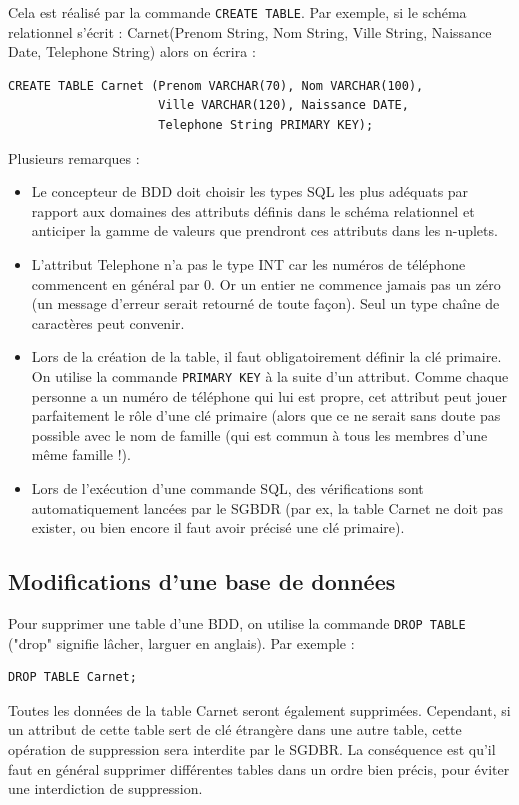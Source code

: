 \documentclass[11pt,a4paper,french,twoside]{PMCours}
\begin{document}
Cela est réalisé par la commande \verb'CREATE TABLE'. Par exemple, si le schéma relationnel s'écrit : 
Carnet(Prenom String, Nom String, Ville String, Naissance Date, Telephone String)
alors on écrira :
\begin{verbatim}
CREATE TABLE Carnet (Prenom VARCHAR(70), Nom VARCHAR(100), 
                     Ville VARCHAR(120), Naissance DATE,
                     Telephone String PRIMARY KEY);
\end{verbatim}
Plusieurs remarques : 
\begin{itemize}
 \item Le concepteur de BDD doit choisir les types SQL les plus adéquats par rapport aux domaines des attributs définis dans le schéma relationnel et anticiper la gamme de valeurs que prendront ces attributs dans les n-uplets.
 \item L'attribut Telephone n'a pas le type INT car les numéros de téléphone commencent en général par 0. Or un entier ne commence jamais pas un zéro (un message d'erreur serait retourné de toute façon). Seul un type chaîne de caractères peut convenir.
 \item Lors de la création de la table, il faut obligatoirement définir la clé primaire. On utilise la commande \verb'PRIMARY KEY' à la suite d'un attribut. Comme chaque personne a un numéro de téléphone qui lui est propre, cet attribut peut jouer parfaitement le rôle d'une clé primaire (alors que ce ne serait sans doute pas possible avec le nom de famille (qui est commun à tous les membres d'une même famille !). %
 \item Lors de l'exécution d'une commande SQL, des vérifications sont automatiquement lancées par le SGBDR (par ex, la table Carnet ne doit pas exister, ou bien encore il faut avoir précisé une clé primaire).
\end{itemize}


\subsection{Modifications d'une base de données}

Pour supprimer une table d'une BDD, on utilise la commande \verb'DROP TABLE' ("drop" signifie lâcher, larguer en anglais). Par exemple : 
\begin{verbatim}
DROP TABLE Carnet;
\end{verbatim}
Toutes les données de la table Carnet seront également supprimées. Cependant, si un attribut de cette table sert de clé étrangère dans une autre table, cette opération de suppression sera interdite par le SGDBR. La conséquence est qu'il faut en général supprimer différentes tables dans un ordre bien précis, pour éviter une interdiction de suppression.
\end{document}
